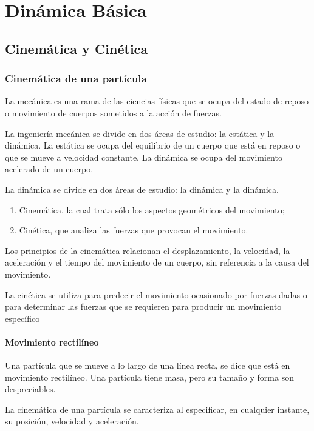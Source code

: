 \chapter{Dinámica Básica}

\section{Cinemática y Cinética}

\subsection{Cinemática de una partícula}

La mecánica es una rama de las ciencias físicas que se ocupa del estado de reposo o movimiento de cuerpos sometidos a la acción de fuerzas. 

La ingeniería mecánica se divide en dos áreas de estudio: la estática y la dinámica. La estática se ocupa del equilibrio de un cuerpo que está en reposo o que se mueve a velocidad constante. La dinámica se ocupa del movimiento acelerado de un cuerpo. 

La dinámica se divide en dos áreas de estudio: la dinámica y la dinámica.

\begin{enumerate}
    \item Cinemática, la cual trata sólo los aspectos geométricos del movimiento; 
    \item Cinética, que analiza las fuerzas que provocan el movimiento.
\end{enumerate}

Los principios de la cinemática relacionan el desplazamiento, la velocidad, la aceleración y el tiempo del movimiento de un cuerpo, sin referencia a la causa del movimiento.

La cinética se utiliza para predecir el movimiento ocasionado por fuerzas dadas o para determinar las fuerzas que se requieren para producir un movimiento específico

\subsubsection{Movimiento rectilíneo}

Una partícula que se mueve a lo largo de una línea recta, se dice que está en movimiento rectilíneo. Una partícula tiene masa, pero su tamaño y forma son despreciables. 

La cinemática de una partícula se caracteriza al especificar, en cualquier
instante, su posición, velocidad y aceleración. 

